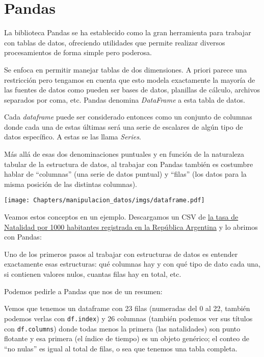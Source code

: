 \section{Pandas} \label{sec:pandas}

La biblioteca Pandas se ha establecido como la gran herramienta para trabajar con tablas de datos, ofreciendo utilidades que permite realizar diversos procesamientos de forma simple pero poderosa.

Se enfoca en permitir manejar tablas de dos dimensiones. A priori parece una restricción pero tengamos en cuenta que esto modela exactamente la mayoría de las fuentes de datos como pueden ser bases de datos, planillas de cálculo, archivos separados por coma, etc. Pandas denomina \textit{DataFrame} a esta tabla de datos.

Cada \textit{dataframe} puede ser considerado entonces como un conjunto de columnas donde cada una de estas últimas será una serie de escalares de algún tipo de datos específico. A estas se las llama \textit{Series}.

Más allá de esas dos denominaciones puntuales y en función de la naturaleza tabular de la estructura de datos, al trabajar con Pandas también es costumbre hablar de ``columnas'' (una serie de datos puntual) y ``filas'' (los datos para la misma posición de las distintas columnas).

\begin{center}
    \texttt{[image: Chapters/manipulacion\_datos/imgs/dataframe.pdf]}
\end{center}

Veamos estos conceptos en un ejemplo. Descargamos un CSV de \href{https://www.datos.gob.ar/dataset/salud-tasa-natalidad}{la tasa de Natalidad por 1000 habitantes registrada en la República Argentina} y lo abrimos con Pandas:


Uno de los primeros pasos al trabajar con estructuras de datos es entender exactamente esas estructuras: qué columnas hay y con qué tipo de dato cada una, si contienen valores nulos, cuantas filas hay en total, etc.

Podemos pedirle a Pandas que nos de un resumen:


Vemos que tenemos un dataframe con 23 filas (numeradas del 0 al 22, también podemos verlas con \texttt{df.index}) y 26 columnas (también podemos ver sus títulos con \texttt{df.columns}) donde todas menos la primera (las natalidades) son punto flotante y esa primera (el índice de tiempo) es un objeto genérico; el conteo de ``no nulas'' es igual al total de filas, o sea que tenemos una tabla completa.

